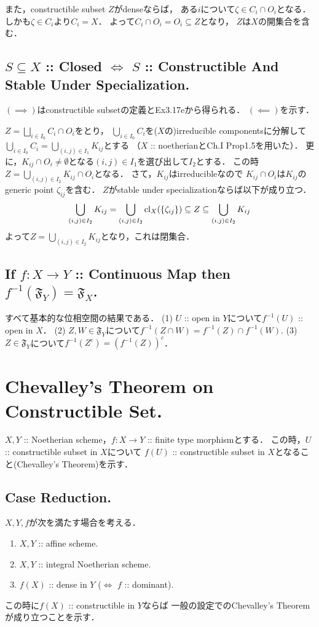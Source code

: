 \documentclass[a4paper]{jsarticle}
\begin{document}
    また，constructible subset $Z$がdenseならば，
    ある$i$について$\zeta \in C_i \cap O_i$となる．
    しかも$\zeta \in C_i$より$C_i=X$．
    よって$C_i \cap O_i=O_i \subseteq Z$となり，
    $Z$は$X$の開集合を含む．

    \subsection{$S \subseteq X$ :: Closed $\iff$ $S$ :: Constructible And Stable Under Specialization.}
    $(\implies)$はconstructible subsetの定義とEx3.17eから得られる．
    $(\impliedby)$を示す．

    $Z=\bigsqcup_{i \in I_0} C_i \cap O_i$をとり，
    $\bigcup_{i \in I_0} C_i$を($X$の)irreducible componentsに分解して
    $\bigcup_{i \in I_0} C_i=\bigcup_{(i,j) \in I_1} K_{ij}$とする
    （$X$ :: noetherianとCh.I Prop1.5を用いた）．
    更に，$K_{ij} \cap O_i \neq \emptyset$となる$(i,j) \in I_1$を選び出して$I_2$とする．
    この時$Z=\bigcup_{(i,j) \in I_2} K_{ij} \cap O_i$となる．
    さて，$K_{ij}$はirreducibleなので
    $K_{ij} \cap O_i$は$K_{ij}$のgeneric point $\zeta_{ij}$を含む．
    $Z$がstable under specializationならば以下が成り立つ．
    \[
        \bigcup_{(i,j) \in I_2} K_{ij}
        =\bigcup_{(i,j) \in I_2} \operatorname{cl}_X(\{\zeta_{ij}\})
        \subseteq Z
        \subseteq \bigcup_{(i,j) \in I_2} K_{ij}
    \]
    よって$Z=\bigcup_{(i,j) \in I_2} K_{ij}$となり，これは閉集合．

    \subsection{If $f: X \to Y$ :: Continuous Map then $f^{-1}(\mathfrak{F}_Y)=\mathfrak{F}_X$.}
    すべて基本的な位相空間の結果である．
    (1) $U$ :: open in $Y$について$f^{-1}(U)$ :: open in $X$．
    (2) $Z,W \in \mathfrak{F}_Y$について$f^{-1}(Z \cap W)=f^{-1}(Z) \cap f^{-1}(W)$.
    (3) $Z \in \mathfrak{F}_Y$について$f^{-1}(Z^c)=(f^{-1}(Z))^c$．

\section{Chevalley's Theorem on Constructible Set.} %
    $X,Y$ :: Noetherian scheme，$f: X \to Y$ :: finite type morphismとする．
    この時，$U$ :: constructible subset in $X$について
    $f(U)$ :: constructible subset in $X$となること(Chevalley's Theorem)を示す．

    \subsection{Case Reduction.}
    $X, Y, f$が次を満たす場合を考える．
    \begin{enumerate}[label=(\arabic*),leftmargin=5\parindent]
        \item $X,Y$ :: affine scheme.
        \item $X,Y$ :: integral Noetherian scheme.
        \item $f(X)$ :: dense in $Y$ ($\iff$ $f$ :: dominant).
    \end{enumerate}
    この時に$f(X)$ :: constructible in $Y$ならば
    一般の設定でのChevalley's Theoremが成り立つことを示す．
\end{document}
